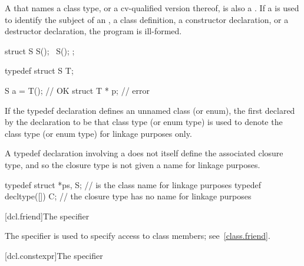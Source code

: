\pnum
\begin{note}
%
A  that names a class type, or a cv-qualified
version thereof, is also a . If
a  is used to identify the subject of an
, a class
definition, a constructor
declaration, or a destructor
declaration, the program is ill-formed.
\end{note}
\begin{example}

\begin{codeblock}
struct S {
  S();
  ~S();
};

typedef struct S T;

S a = T();                      // OK
struct T * p;                   // error
\end{codeblock}
\end{example}

\pnum
{}%
%
%
If the typedef declaration defines an unnamed class (or enum), the first
 declared by the declaration to be that class
type (or enum type) is used to denote the class type (or enum type) for
linkage purposes only.
\begin{note}
A typedef declaration involving a 
does not itself define the associated closure type,
and so the closure type is not given a name for linkage purposes.
\end{note}
\begin{example}
\begin{codeblock}
typedef struct { } *ps, S;      //  is the class name for linkage purposes
typedef decltype([]{}) C;       // the closure type has no name for linkage purposes
\end{codeblock}
\end{example}

[dcl.friend]{The  specifier}%

\pnum
The  specifier is used to specify access to class members;
see~\ref{class.friend}.

[dcl.constexpr]{The  specifier}%

